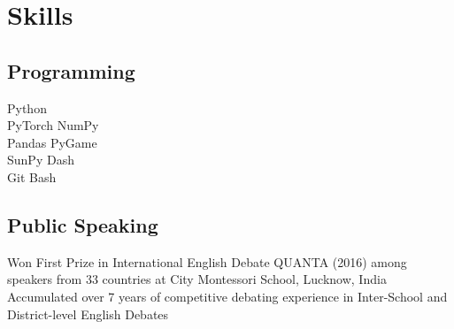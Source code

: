 \documentclass[]{raahul_singh_resume}
\begin{document}
\begin{minipage}[t]{0.33\textwidth}
\section{Skills}
\subsection{Programming}
Python \\
PyTorch  \textbullet{} NumPy \\
Pandas  \textbullet{} PyGame  \\
SunPy \textbullet{} Dash \\
Git  \textbullet{} Bash \\
\sectionsep

\subsection{Public Speaking}
\textbullet{} Won First Prize in International English Debate QUANTA (2016) among speakers from 33 countries at City Montessori School, Lucknow, India \\
\textbullet{} Accumulated over 7 years of competitive debating experience in Inter-School and District-level English Debates
\sectionsep

\end{minipage} 
\hfill
\end{document}
